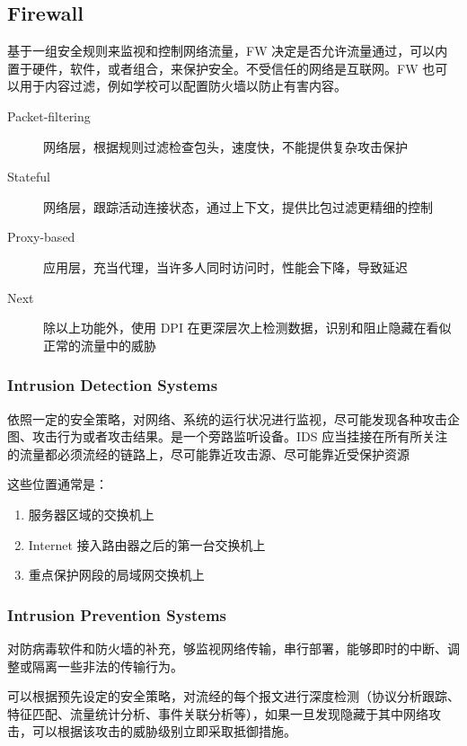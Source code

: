 \documentclass[11pt,journal,compsoc]{IEEEtran}
\begin{document}
\subsection{Firewall}

基于一组安全规则来监视和控制网络流量，FW 决定是否允许流量通过，可以内置于硬件，软件，或者组合，来保护安全。不受信任的网络是互联网。FW 也可以用于内容过滤，例如学校可以配置防火墙以防止有害内容。


\begin{description}
    \item[Packet-filtering] 网络层，根据规则过滤检查包头，速度快，不能提供复杂攻击保护

    \item[Stateful] 网络层，跟踪活动连接状态，通过上下文，提供比包过滤更精细的控制
    
    \item[Proxy-based] 应用层，充当代理，当许多人同时访问时，性能会下降，导致延迟

    \item[Next] 除以上功能外，使用 DPI 在更深层次上检测数据，识别和阻止隐藏在看似正常的流量中的威胁
\end{description}


\subsubsection{Intrusion Detection Systems}

依照一定的安全策略，对网络、系统的运行状况进行监视，尽可能发现各种攻击企图、攻击行为或者攻击结果。是一个旁路监听设备。IDS 应当挂接在所有所关注的流量都必须流经的链路上，尽可能靠近攻击源、尽可能靠近受保护资源

这些位置通常是：

\begin{enumerate}
    \item 服务器区域的交换机上
    \item Internet 接入路由器之后的第一台交换机上
    \item 重点保护网段的局域网交换机上
\end{enumerate}


\subsubsection{Intrusion Prevention Systems}

对防病毒软件和防火墙的补充，够监视网络传输，串行部署，能够即时的中断、调整或隔离一些非法的传输行为。

可以根据预先设定的安全策略，对流经的每个报文进行深度检测（协议分析跟踪、特征匹配、流量统计分析、事件关联分析等），如果一旦发现隐藏于其中网络攻击，可以根据该攻击的威胁级别立即采取抵御措施。
\end{document}
